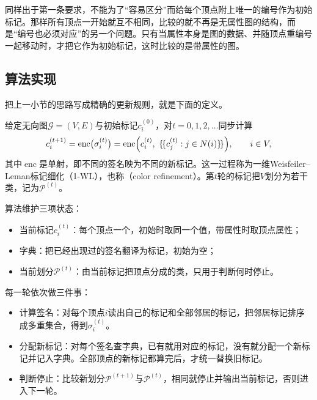 同样出于第一条要求，不能为了“容易区分”而给每个顶点附上唯一的编号作为初始标记。那样所有顶点一开始就互不相同，比较的就不再是无属性图的结构，而是“编号也必须对应”的另一个问题。只有当属性本身是图的数据、并随顶点重编号一起移动时，才把它作为初始标记，这时比较的是带属性的图。

\subsection{算法实现}
\label{sec:graph-trav-wl-algorithm}

把上一小节的思路写成精确的更新规则，就是下面的定义。

\begin{definition}[1-WL标记细化]
\label{def:graph-trav-wl-refinement}
给定无向图$\mathcal G=(V,E)$与初始标记$c_i^{(0)}$，对$t=0,1,2,\ldots$同步计算
\begin{equation}
c_i^{(t+1)}=\operatorname{enc}\bigl(\sigma_i^{(t)}\bigr)
=\operatorname{enc}\Bigl(c_i^{(t)},\ \{\!\{c_j^{(t)}:j\in N(i)\}\!\}\Bigr),
\qquad i\in V,
\label{eq:graph-trav-wl-update}
\end{equation}
其中$\operatorname{enc}$是单射，即不同的签名映为不同的新标记。这一过程称为一维Weisfeiler--Leman标记细化（1-WL），也称（color refinement）。第$t$轮的标记把$V$划分为若干类，记为$\mathcal P^{(t)}$。
\end{definition}

算法维护三项状态：
\begin{itemize}
  \item 当前标记$c_i^{(t)}$：每个顶点一个，初始时取同一个值，带属性时取顶点属性；
  \item 字典：把已经出现过的签名翻译为标记，初始为空；
  \item 当前划分$\mathcal P^{(t)}$：由当前标记把顶点分成的类，只用于判断何时停止。
\end{itemize}

每一轮依次做三件事：
\begin{itemize}
  \item 计算签名：对每个顶点$i$读出自己的标记和全部邻居的标记，把邻居标记排序成多重集合，得到$\sigma_i^{(t)}$。
  \item 分配新标记：对每个签名查字典，已有就用对应的标记，没有就分配一个新标记并记入字典。全部顶点的新标记都算完后，才统一替换旧标记。
  \item 判断停止：比较新划分$\mathcal P^{(t+1)}$与$\mathcal P^{(t)}$，相同就停止并输出当前标记，否则进入下一轮。
\end{itemize}

